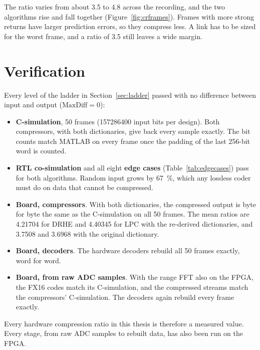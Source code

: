 The ratio varies from about \num{3.5} to \num{4.8} across the recording, and
the two algorithms rise and fall together (Figure~\ref{fig:crframes}). Frames
with more strong returns have larger prediction errors, so they compress less.
A link has to be sized for the worst frame, and a ratio of \num{3.5} still
leaves a wide margin.

\section{Verification}
\label{sec:verifres}

Every level of the ladder in Section~\ref{sec:ladder} passed with no
difference between input and output ($\mathrm{MaxDiff} = 0$):

\begin{itemize}
\item \textbf{C-simulation}, 50 frames (\num{157286400} input bits per
design). Both compressors, with both dictionaries, give back every sample
exactly. The bit counts match MATLAB on every frame once the padding of the
last 256-bit word is counted.
\item \textbf{RTL co-simulation} and all eight \textbf{edge cases}
(Table~\ref{tab:edgecases}) pass for both algorithms. Random input grows by
\SI{67}{\percent}, which any lossless coder must do on data that cannot be
compressed.
\item \textbf{Board, compressors}. With both dictionaries, the compressed
output is byte for byte the same as the C-simulation on all 50 frames. The mean
ratios are \num{4.21704} for DRHE and \num{4.40345} for LPC with the
re-derived dictionaries, and \num{3.7508} and \num{3.6968} with the original
dictionary.
\item \textbf{Board, decoders}. The hardware decoders rebuild all 50 frames
exactly, word for word.
\item \textbf{Board, from raw ADC samples}. With the range FFT also on the
FPGA, the FX16 codes match its C-simulation, and the compressed streams match
the compressors' C-simulation. The decoders again rebuild every frame exactly.
\end{itemize}

\noindent
Every hardware compression ratio in this thesis is therefore a measured value.
Every stage, from raw ADC samples to rebuilt data, has also been run on the
FPGA.

